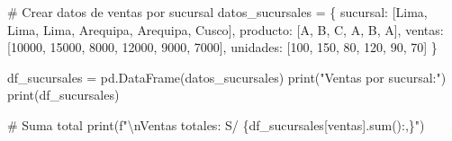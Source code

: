 \documentclass[
  doc,
  floatsintext,
  longtable,
  a4paper,
  nolmodern,
  notxfonts,
  notimes,
  12pt,
  colorlinks=true,linkcolor=blue,citecolor=blue,urlcolor=blue]{apa7}
\newenvironment{Shaded}{\begin{snugshade}}{\end{snugshade}}
\newcommand{\BuiltInTok}[1]{\textcolor[rgb]{0.00,0.23,0.31}{#1}}
\newcommand{\CharTok}[1]{\textcolor[rgb]{0.13,0.47,0.30}{#1}}
\newcommand{\CommentTok}[1]{\textcolor[rgb]{0.37,0.37,0.37}{#1}}
\newcommand{\DecValTok}[1]{\textcolor[rgb]{0.68,0.00,0.00}{#1}}
\newcommand{\NormalTok}[1]{\textcolor[rgb]{0.00,0.23,0.31}{#1}}
\newcommand{\OperatorTok}[1]{\textcolor[rgb]{0.37,0.37,0.37}{#1}}
\newcommand{\SpecialCharTok}[1]{\textcolor[rgb]{0.37,0.37,0.37}{#1}}
\newcommand{\SpecialStringTok}[1]{\textcolor[rgb]{0.13,0.47,0.30}{#1}}
\newcommand{\StringTok}[1]{\textcolor[rgb]{0.13,0.47,0.30}{#1}}
\begin{document}
\begin{Shaded}
\begin{Highlighting}[]
\CommentTok{\# Crear datos de ventas por sucursal}
\NormalTok{datos\_sucursales }\OperatorTok{=}\NormalTok{ \{}
    \StringTok{\textquotesingle{}sucursal\textquotesingle{}}\NormalTok{: [}\StringTok{\textquotesingle{}Lima\textquotesingle{}}\NormalTok{, }\StringTok{\textquotesingle{}Lima\textquotesingle{}}\NormalTok{, }\StringTok{\textquotesingle{}Lima\textquotesingle{}}\NormalTok{, }\StringTok{\textquotesingle{}Arequipa\textquotesingle{}}\NormalTok{, }\StringTok{\textquotesingle{}Arequipa\textquotesingle{}}\NormalTok{, }\StringTok{\textquotesingle{}Cusco\textquotesingle{}}\NormalTok{],}
    \StringTok{\textquotesingle{}producto\textquotesingle{}}\NormalTok{: [}\StringTok{\textquotesingle{}A\textquotesingle{}}\NormalTok{, }\StringTok{\textquotesingle{}B\textquotesingle{}}\NormalTok{, }\StringTok{\textquotesingle{}C\textquotesingle{}}\NormalTok{, }\StringTok{\textquotesingle{}A\textquotesingle{}}\NormalTok{, }\StringTok{\textquotesingle{}B\textquotesingle{}}\NormalTok{, }\StringTok{\textquotesingle{}A\textquotesingle{}}\NormalTok{],}
    \StringTok{\textquotesingle{}ventas\textquotesingle{}}\NormalTok{: [}\DecValTok{10000}\NormalTok{, }\DecValTok{15000}\NormalTok{, }\DecValTok{8000}\NormalTok{, }\DecValTok{12000}\NormalTok{, }\DecValTok{9000}\NormalTok{, }\DecValTok{7000}\NormalTok{],}
    \StringTok{\textquotesingle{}unidades\textquotesingle{}}\NormalTok{: [}\DecValTok{100}\NormalTok{, }\DecValTok{150}\NormalTok{, }\DecValTok{80}\NormalTok{, }\DecValTok{120}\NormalTok{, }\DecValTok{90}\NormalTok{, }\DecValTok{70}\NormalTok{]}
\NormalTok{\}}

\NormalTok{df\_sucursales }\OperatorTok{=}\NormalTok{ pd.DataFrame(datos\_sucursales)}
\BuiltInTok{print}\NormalTok{(}\StringTok{"Ventas por sucursal:"}\NormalTok{)}
\BuiltInTok{print}\NormalTok{(df\_sucursales)}

\CommentTok{\# Suma total}
\BuiltInTok{print}\NormalTok{(}\SpecialStringTok{f"}\CharTok{\textbackslash{}n}\SpecialStringTok{Ventas totales: S/ }\SpecialCharTok{\{}\NormalTok{df\_sucursales[}\StringTok{\textquotesingle{}ventas\textquotesingle{}}\NormalTok{]}\SpecialCharTok{.}\BuiltInTok{sum}\NormalTok{()}\SpecialCharTok{:,\}}\SpecialStringTok{"}\NormalTok{)}


\end{Highlighting}
\end{Shaded}
\end{document}
